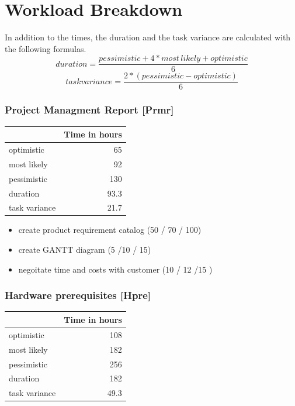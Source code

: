 \chapter{Workload Breakdown}
In addition to the times, the duration and the task variance are calculated with the following formulas. 
\\
\[duration = \dfrac{pessimistic + 4 * most\, likely + optimistic}{6}\]
\[task variance = \dfrac{2 * (pessimistic - optimistic)}{6}\]
\subsection*{Project Managment Report [Prmr]}
\label{sec:orgd96ec13}
\begin{center}
\begin{tabular}{|l|r|}
	\hline
	 & Time in hours\\
	 \hline
	optimistic & 65\\
	\hline
	most likely & 92\\
	\hline
	pessimistic & 130\\
	\hline
	\hline
	duration & 93.3\\
	\hline
	task variance & 21.7\\
	\hline
\end{tabular}
\end{center}
\begin{itemize}
\item create product requirement catalog (50 / 70 / 100)
\item create GANTT diagram (5 /10 / 15)
\item negoitate time and costs with customer (10 / 12 /15 )
\end{itemize}

\subsection*{Hardware prerequisites [Hpre]}
\label{sec:orgfb33f5b}

\begin{center}
	\begin{tabular}{|l|r|}
		\hline
		& Time in hours\\
		\hline
		optimistic & 108\\
		\hline
		most likely & 182\\
		\hline
		pessimistic & 256\\
		\hline
		\hline
		duration & 182\\
		\hline
		task variance & 49.3\\
		\hline
	\end{tabular}
\end{center}


